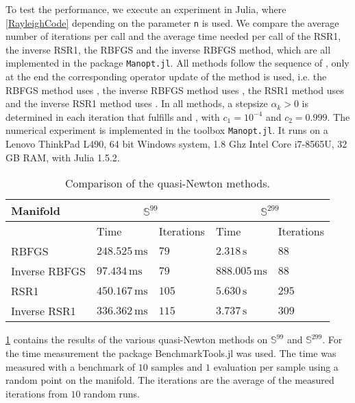 To test the performance, we execute an experiment in Julia, where \cref{RayleighCode} depending on the parameter \lstinline!n! is used. We compare the average number of iterations per call and the average time needed per call of the RSR1, the inverse RSR1, the RBFGS and the inverse RBFGS method, which are all implemented in the package \lstinline!Manopt.jl!. All methods follow the sequence of , only at the end the corresponding operator update of the method is used, i.e. the RBFGS method uses , the inverse RBFGS method uses , the RSR1 method uses  and the inverse RSR1 method uses . In all methods, a stepsize $\alpha_k > 0$ is determined in each iteration that fulfills  and , with $c_1 = 10^{−4}$ and $c_2 = 0.999$. The numerical experiment is implemented in the toolbox \lstinline!Manopt.jl!. It runs on a Lenovo ThinkPad L490, 64 bit Windows system, 1.8 Ghz Intel Core i7-8565U, 32 GB RAM, with Julia 1.5.2.
\begin{table}[H]\label{tab:Results}
    \center
        \begin{tabular}{l l l l l }
            \toprule
            Manifold & \multicolumn{2}{c}{$\mathbb{S}^{99}$} & \multicolumn{2}{c}{$\mathbb{S}^{299}$}   \\ 
            \midrule
            & Time & Iterations & Time & Iterations  \\ 
            \midrule
            RBFGS & $248.525 \, \mathrm{ms}$ & $79$ & $2.318 \, \mathrm{s}$ & $88$  \\ 
            \midrule
            Inverse RBFGS & $97.434 \, \mathrm{ms}$ & $79$ & $888.005 \, \mathrm{ms}$ & $88$   \\
            \midrule
            RSR1 & $450.167 \, \mathrm{ms}$ & $105$ & $5.630 \, \mathrm{s}$ & $295$  \\ 
            \midrule
            Inverse RSR1 & $336.362 \, \mathrm{ms}$ & $115$ & $3.737 \, \mathrm{s}$ & $309$   \\
            \bottomrule
        \end{tabular}

    \caption{Comparison of the quasi-Newton methods.}
\end{table}
\cref{tab:Results} contains the results of the various quasi-Newton methods on $\mathbb{S}^{99}$ and $\mathbb{S}^{299}$. For the time measurement the package BenchmarkTools.jl was used. The time was measured with a benchmark of $10$ samples and $1$ evaluation per sample using a random point on the manifold. The iterations are the average of the measured iterations from $10$ random runs. \\
